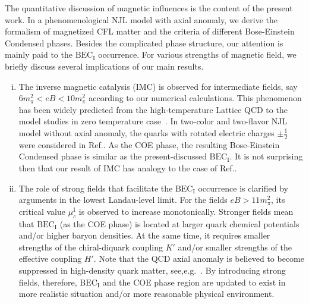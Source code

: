 \documentclass[prd, showpacs,nofootinbib,amsmath,amssymb,12pt]{revtex4}
\begin{document}
The quantitative discussion of magnetic influences is the content of the present work.  
In a phenomenological NJL model with axial anomaly, we derive the formalism of magnetized CFL matter and the criteria of different Bose-Einstein Condensed phases. Besides the complicated phase structure, our attention is mainly paid to the $\text{BEC}_\text{I}$ occurrence. For various strengths of magnetic field, we briefly discuss several implications of our main results.
\begin{enumerate}[(i)]

\item The inverse magnetic catalysis (IMC) is observed for intermediate fields, say $ 6m_\pi^2<eB < 10m_\pi^2$ according to our numerical calculations. This phenomenon has been widely predicted from the high-temperature Lattice QCD to the model studies in zero temperature case~\cite{andersen2016phase,duarte2015bec}.
In two-color and two-flavor NJL model without axial anomaly, the quarks with rotated electric charges $\pm \frac{1}{2}$ were considered in Ref.\cite{duarte2015bec}. As the COE phase, the resulting Bose-Einstein Condensed phase is similar as the present-discussed $\text{BEC}_\text{I}$. It is not surprising then that our result of IMC has analogy to the case of Ref.\cite{duarte2015bec}.  


\item The role of strong fields that facilitate the $\text{BEC}_\text{I}$ occurrence is clarified by arguments in the lowest Landau-level limit. For the fields $eB > 11m_\pi^2$, its critical value $\mu^\text{I}_c$ is observed to increase monotonically. Stronger fields mean that $\text{BEC}_\text{I}$ (as the COE phase) is located at larger quark chemical potentials and/or higher baryon densities.
At the same time, it requires smaller strengths of the chiral-diquark coupling $K'$ and/or smaller strengths of the effective coupling $H'$. Note that the QCD axial anomaly is believed to become suppressed in high-density quark matter, see,e.g.~\cite{T2002Instanton,R2000High}. By introducing strong fields, therefore, $\text{BEC}_\text{I}$ and the COE phase region are updated to exist in more realistic situation and/or more reasonable physical environment. 


\end{enumerate}
\end{document}
